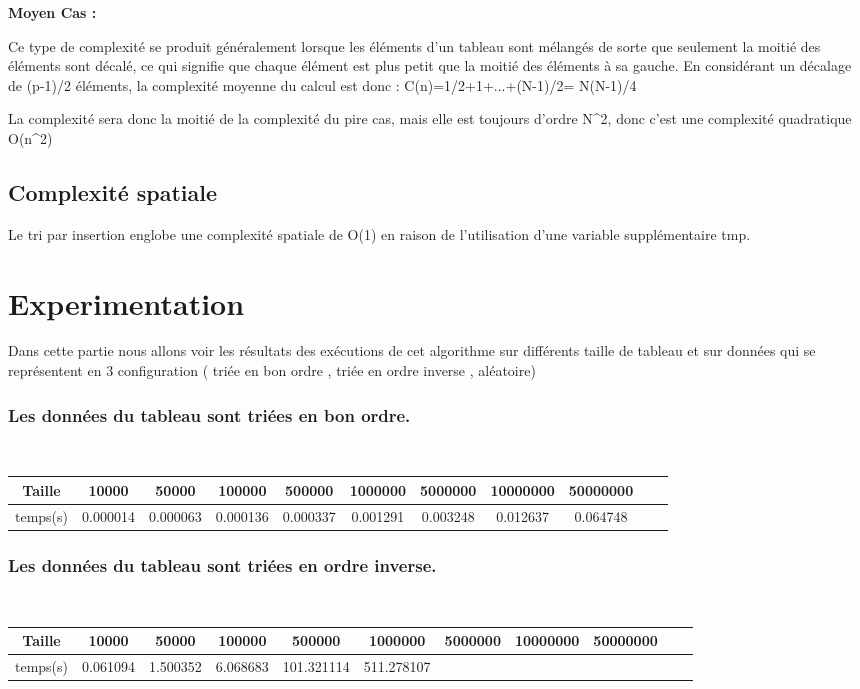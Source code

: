 \textbf{Moyen Cas :}
\par
Ce type de complexité se produit généralement lorsque les éléments d'un tableau sont mélangés de sorte que seulement la moitié des éléments sont décalé, ce qui signifie que chaque élément est plus petit que la moitié des éléments à sa gauche. En considérant un décalage de (p-1)/2 éléments, la complexité moyenne du calcul est donc :
C(n)=1/2+1+...+(N-1)/2= N(N-1)/4

La complexité sera donc la moitié de la complexité du pire cas, mais elle est toujours d'ordre N^{2}, donc c'est une complexité quadratique O(n^{2})


\subsection{Complexité spatiale}
Le tri par insertion englobe une complexité spatiale de O(1) en raison de l'utilisation d'une variable supplémentaire tmp.
\section{Experimentation}
Dans cette partie nous allons voir les résultats des exécutions de cet algorithme sur différents taille de tableau et sur données qui se représentent en 3 configuration ( triée en bon ordre , triée en ordre inverse , aléatoire) 
\subsubsection{Les données du tableau sont triées en bon ordre.}
\\
\begin{tabular}{| c | c | c | c | c | c | c | c | c | c | c |}
    \hline 
     Taille &  10000 & 50000 & 100000 & 500000 & 1000000 & 5000000 & 10000000 & 50000000 \\
    \hline
    temps(s) & 0.000014	& 0.000063 & 0.000136 &	0.000337	& 0.001291 &	0.003248 &	0.012637 &	0.064748	 \\
   \hline
   
\end{tabular}
\par

\subsubsection{Les données du tableau sont triées en ordre inverse.}
\\
\begin{tabular}{| c | c | c | c | c | c | c | c | c | c | c |}
    \hline 
     Taille &  10000 & 50000 & 100000 & 500000 & 1000000 & 5000000 & 10000000 & 50000000 \\
    \hline
    temps(s) & 0.061094 &	1.500352 &	6.068683 	& 101.321114 &	511.278107  &  & & \\
   
   \hline
\end{tabular}
\par
